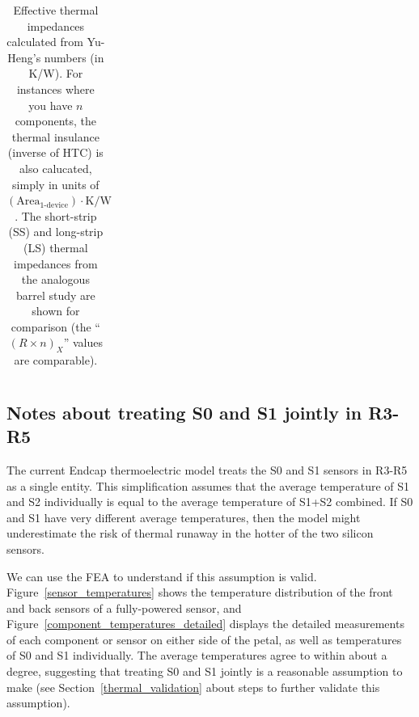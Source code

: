 \begin{table}[h]
\begin{center}
{\begin{tabular}{|l|cc|c|c|c|c|c|c|}
\hline \end{tabular}
} %
\end{center}
\caption{Effective thermal impedances calculated from Yu-Heng's numbers (in K/W).
For instances where you have $n$ components, the thermal insulance (inverse of HTC) is also calucated, simply
in units of {${(\text{Area}_\text{1-device})\cdot\text{K/W}}$}.
The short-strip (SS) and long-strip (LS) thermal impedances from the analogous barrel study are shown
for comparison (the ``$(R\times n)_X$'' values are comparable).
}
\label{tab:thermal_impedances}
\end{table}
\let\arraystretch\arraystretcha

\subsection{Notes about treating S0 and S1 jointly in R3-R5}
\label{two_sensors_thermal_treat}

The current Endcap thermoelectric model treats the S0 and S1 sensors in R3-R5 as a single entity.
This simplification assumes that the average temperature of S1 and S2 individually is equal to the
average temperature of S1+S2 combined. If S0 and S1 have very different average temperatures, then
the model might underestimate the risk of thermal runaway in the hotter of the two silicon sensors.

We can use the FEA to understand if this assumption is valid.
Figure~\ref{sensor_temperatures} shows the temperature distribution of the front and back sensors of a
fully-powered sensor, and Figure~\ref{component_temperatures_detailed} displays the detailed
measurements of each component or sensor on either side of the petal, as well as temperatures of S0 and
S1 individually. The average temperatures agree to within about a degree, suggesting that treating
S0 and S1 jointly is a reasonable assumption to make (see Section~\ref{thermal_validation} about steps
to further validate this assumption).

